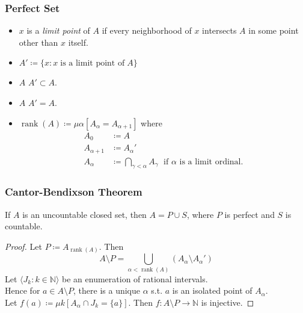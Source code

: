 \documentclass[UTF8,11pt,colorlinks,compress,openany]{beamer}%
\begin{document}
\begin{frame}\frametitle{Perfect Set}
	\begin{itemize}
		\item $x$ is a \emph{limit point} of $A$ if every neighborhood of $x$ intersects $A$ in some point other than $x$ itself.
		\item $A'\coloneqq \big\{x: x\;\text{is a limit point of}\;A\big\}$
		\item $A$  $A'\subset A$.
		\item $A$  $A'=A.$
		\begin{center}
		\end{center}
		\item $\operatorname{rank}(A)\coloneqq \mu\alpha[A_\alpha=A_{\alpha+1}]$ where
		\begin{align*}
		A_0&\coloneqq A\\
		A_{\alpha+1}&\coloneqq A_\alpha'\\
		A_\alpha&\coloneqq \bigcap\limits_{\gamma<\alpha}A_\gamma\;\mbox{ if $\alpha$ is a limit ordinal.}
		\end{align*}
	\end{itemize}
\end{frame}

\begin{frame}\frametitle{Cantor-Bendixson Theorem}
	\begin{theorem}
		If $A$ is an uncountable closed set, then $A=P\cup S$, where $P$ is perfect and $S$ is countable.
	\end{theorem}\vspace{-1ex}
	\begin{proof}
		Let $P\coloneqq A_{\operatorname{rank}(A)}$.
		Then
		\[A\setminus P=\bigcup\limits_{\alpha<\operatorname{rank}(A)}\left(A_\alpha\setminus A_\alpha'\right)\]
		Let $\langle J_k: k\in\mathbb{N}\rangle$ be an enumeration of rational intervals.\\
		Hence for $a\in A\setminus P$, there is a unique $\alpha$ s.t. $a$ is an isolated point of $A_\alpha$.\\
		Let $f(a)\coloneqq \mu k[A_\alpha\cap J_k=\{a\}]$. Then $f: A\setminus P\to\mathbb{N}$ is injective.
	\end{proof}
\end{frame}
\end{document}
